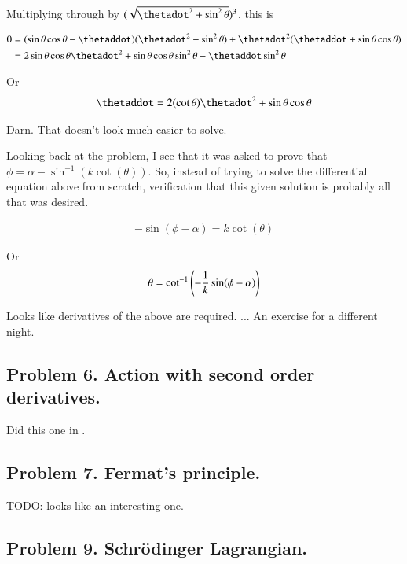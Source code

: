 \documentclass{article}
\begin{document}
Multiplying through by $(\sqrt{\thetadot^2 + \sin^2\theta })^3$, this is

\begin{align*}
0 
&= (\sin\theta \cos\theta - \thetaddot) ( \thetadot^2 + \sin^2\theta ) + \thetadot^2( \thetaddot + \sin\theta\cos\theta )  \\
&= 
2 \sin\theta \cos\theta \thetadot^2 
+ \sin\theta \cos\theta \sin^2\theta 
- \thetaddot \sin^2\theta  
\\
\end{align*}

Or
\begin{align*}
\thetaddot =
2 (\cot\theta) \thetadot^2 
+ \sin\theta \cos\theta 
\end{align*}

Darn.  That doesn't look much easier to solve.

Looking back at the problem, I see that it was asked to prove that $\phi = \alpha - \sin^{-1}(k\cot(\theta))$.  So, instead of trying to solve
the differential equation above from scratch, verification that this given solution is probably all that was desired.

\begin{align*}
-\sin(\phi - \alpha) = k\cot(\theta)
\end{align*}

Or
\begin{align*}
\theta = \cot^{-1}\left(-\frac{1}{k} \sin(\phi - \alpha)\right)
\end{align*}

Looks like derivatives of the above are required. ... An exercise for a different night.

\subsection{ Problem 6.  Action with second order derivatives. }

Did this one in \cite{PJgoldch1}.

\subsection{ Problem 7.  Fermat's principle. }

TODO: looks like an interesting one.

\subsection{ Problem 9.  Schr\"{o}dinger Lagrangian. }
\end{document}
